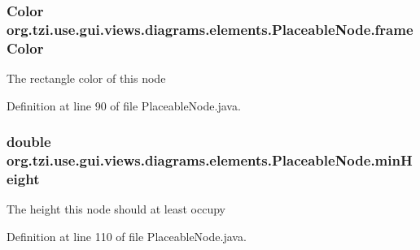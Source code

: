 \hypertarget{classorg_1_1tzi_1_1use_1_1gui_1_1views_1_1diagrams_1_1elements_1_1_placeable_node_acf1652e351e65486fc5e265fd0e1063f}{
\subsubsection[{frame\-Color}]{\setlength{\rightskip}{0pt plus 5cm}Color org.\-tzi.\-use.\-gui.\-views.\-diagrams.\-elements.\-Placeable\-Node.\-frame\-Color\hspace{0.3cm}{\ttfamily [protected]}}}\label{classorg_1_1tzi_1_1use_1_1gui_1_1views_1_1diagrams_1_1elements_1_1_placeable_node_acf1652e351e65486fc5e265fd0e1063f}
The rectangle color of this node 

Definition at line 90 of file Placeable\-Node.\-java.

\hypertarget{classorg_1_1tzi_1_1use_1_1gui_1_1views_1_1diagrams_1_1elements_1_1_placeable_node_abc6784edb9c4b5ff121085d966b15dc5}{
\subsubsection[{min\-Height}]{\setlength{\rightskip}{0pt plus 5cm}double org.\-tzi.\-use.\-gui.\-views.\-diagrams.\-elements.\-Placeable\-Node.\-min\-Height\hspace{0.3cm}{\ttfamily [protected]}}}\label{classorg_1_1tzi_1_1use_1_1gui_1_1views_1_1diagrams_1_1elements_1_1_placeable_node_abc6784edb9c4b5ff121085d966b15dc5}
The height this node should at least occupy 

Definition at line 110 of file Placeable\-Node.\-java.

